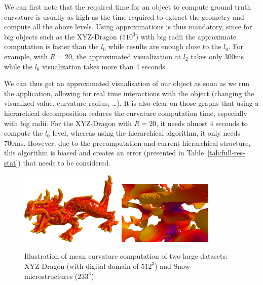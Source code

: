 \documentclass{llncs}
\begin{document}
We can first note that the required time for an object to compute ground truth
curvature is usually as high as the time required to extract the geometry and
compute all the above levels. Using approximations is thus mandatory, since for
big objects such as the XYZ-Dragon ($510^3$) with big radii the approximate
computation is faster than the $l_0$ while results are enough close to the
$l_0$. For example, with $R=20$, the approximated visualization at $l_2$ takes
only 300ms while the $l_0$ visualization takes more than 4 seconds.

We can thus get an approximated visualisation of our object as soon as we run
the application, allowing for real time interactions with the object (changing
the visualized value, curvature radius, \ldots). It is also clear on those
graphs that using a hierarchical decomposition reduces the curvature computation
time, especially with big radii. For the XYZ-Dragon with $R=20$, it needs almost
4 seconds to compute the $l_0$ level, whereas using the hierarchical algorithm,
it only needs 700ms. However, due to the precomputation and current hierarchical
structure, this algorithm is biased and creates an error (presented in
Table~\ref{tab:full-res-stat}) that needs to be considered.

\begin{figure}
  \vspace{-0.35cm}
  \begin{center}
    {\includegraphics[height=3.5cm]{figs/xyzrgb_dragon-510_R8_mean}}
    {\includegraphics[height=3.0cm]{figs/snow_I08iso_233_r20_l0_m3}}
  \end{center}
  \caption{Illustration of mean curvature computation of two large datasets: XYZ-Dragon (with digital domain of $512^3$) and Snow microstructures ($233^3$).}
  \label{fig:adaptive}
  \vspace{-0.35cm}
\end{figure}
\end{document}
